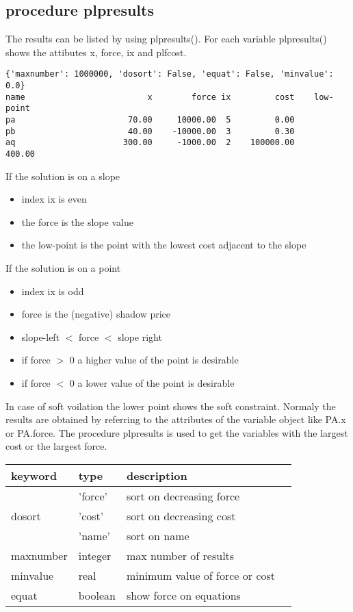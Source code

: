 \documentclass[]{article}
\begin{document}
\subsection{procedure plpresults}
The results can be listed by using plpresults().
For each variable plpresults() shows  the attibutes x, force, ix and plfcost.
\begin{verbatim}
{'maxnumber': 1000000, 'dosort': False, 'equat': False, 'minvalue': 0.0}
name                         x        force ix         cost    low-point
pa                       70.00     10000.00  5         0.00
pb                       40.00    -10000.00  3         0.30
aq                      300.00     -1000.00  2    100000.00       400.00
\end{verbatim}
If the solution is on a slope 
\begin{itemize}
\setlength\itemsep{-1mm}
 \item index ix is even
 \item the force is the slope value
 \item the low-point is the point with the lowest cost adjacent to the slope
 \end{itemize}
If the solution is on a point
\begin{itemize}
\setlength\itemsep{-1mm}
 \item index ix is odd 
 \item force is the (negative) shadow price
 \item slope-left $<$ force $<$ slope right
 \item if force $>$ 0 a higher value of the point is desirable
 \item if force $<$ 0 a lower value of the point is desirable
\end{itemize}

In case of soft voilation the lower point shows the soft constraint.
Normaly the results are obtained by referring to the attributes
of the variable object like PA.x or PA.force.
The procedure plpresults is used to get the variables with the largest cost or the largest force.
\begin{center}
\begin{tabular}{|l|l|l|l|}\hline
  keyword   & type    & description                    \\ \hline \hline
            & 'force' & sort on decreasing force       \\ \hline
  dosort    & 'cost'  & sort on decreasing cost        \\ \hline
            & 'name'  & sort on name                   \\ \hline
  maxnumber & integer & max number of results          \\ \hline
  minvalue  & real    & minimum value of force or cost \\ \hline
  equat     & boolean & show force on equations        \\ \hline
\end{tabular}
\end{center}
\end{document}
